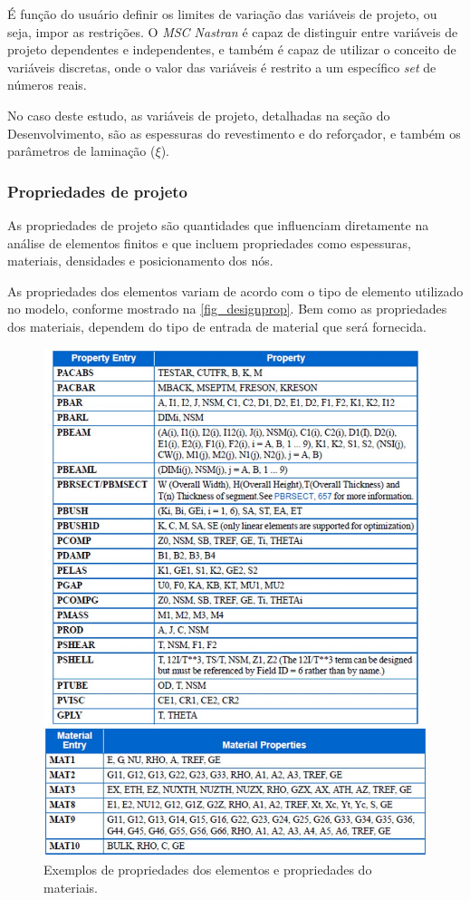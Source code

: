 É função do usuário definir os limites de variação das variáveis de projeto, ou seja, impor as restrições. O \emph{MSC Nastran} é capaz de distinguir entre variáveis de projeto dependentes e independentes, e também é capaz de utilizar o conceito de variáveis discretas, onde o valor das variáveis é restrito a um específico \emph{set} de números reais.

No caso deste estudo, as variáveis de projeto, detalhadas na seção do Desenvolvimento, são as espessuras do revestimento e do reforçador, e também os parâmetros de laminação ($\xi$).

\subsubsection{Propriedades de projeto}
As propriedades de projeto são quantidades que influenciam diretamente na análise de elementos finitos e que incluem propriedades como espessuras, materiais, densidades e posicionamento dos nós.

As propriedades dos elementos variam de acordo com o tipo de elemento utilizado no modelo, conforme mostrado na \autoref{fig_designprop}. Bem como as propriedades dos materiais, dependem do tipo de entrada de material que será fornecida.

\begin{figure}[h]
	\caption{\label{fig_designprop}Exemplos de propriedades dos elementos e propriedades do materiais.}
  \centering
  \includegraphics[scale=0.5]{figura/DesignProp}
\end{figure}

